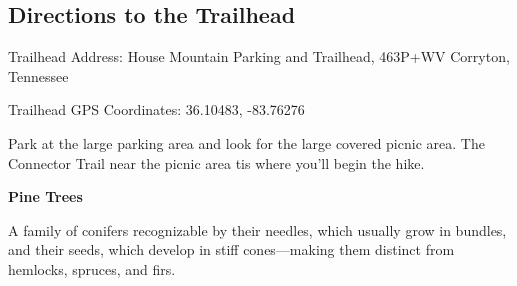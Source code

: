 \documentclass[
  letterpaper,
  DIV=11,
  numbers=noendperiod]{scrreprt}
\begin{document}
\subsection{Directions to the
Trailhead}\label{directions-to-the-trailhead-11}

Trailhead Address: House Mountain Parking and Trailhead, 463P+WV
Corryton, Tennessee

Trailhead GPS Coordinates: 36.10483, -83.76276

Park at the large parking area and look for the large covered picnic
area. The Connector Trail near the picnic area tis where you'll begin
the hike.

\begin{tcolorbox}[enhanced jigsaw, opacityback=0, bottomrule=.15mm, colframe=quarto-callout-note-color-frame, breakable, arc=.35mm, leftrule=.75mm, rightrule=.15mm, toprule=.15mm, left=2mm, colback=white]
\begin{minipage}[t]{5.5mm}
\textcolor{quarto-callout-note-color}{\faInfo}
\end{minipage}%
\begin{minipage}[t]{\textwidth - 5.5mm}

\vspace{-3mm}\textbf{Pine Trees}\vspace{3mm}

A family of conifers recognizable by their needles, which usually grow
in bundles, and their seeds, which develop in stiff cones---making them
distinct from hemlocks, spruces, and firs.

\end{minipage}%
\end{tcolorbox}
\end{document}
